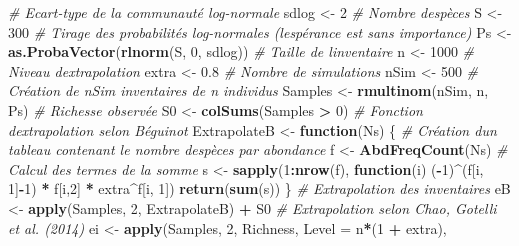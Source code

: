 \documentclass[
  11pt,
  french,
  a4paper,
  extrafontsizes,onecolumn,openright
  ]{memoir}
\newenvironment{Shaded}{\begin{snugshade}}{\end{snugshade}}
\newcommand{\AttributeTok}[1]{\textcolor[rgb]{0.13,0.29,0.53}{#1}}
\newcommand{\CommentTok}[1]{\textcolor[rgb]{0.56,0.35,0.01}{\textit{#1}}}
\newcommand{\ControlFlowTok}[1]{\textcolor[rgb]{0.13,0.29,0.53}{\textbf{#1}}}
\newcommand{\DecValTok}[1]{\textcolor[rgb]{0.00,0.00,0.81}{#1}}
\newcommand{\FloatTok}[1]{\textcolor[rgb]{0.00,0.00,0.81}{#1}}
\newcommand{\FunctionTok}[1]{\textcolor[rgb]{0.13,0.29,0.53}{\textbf{#1}}}
\newcommand{\NormalTok}[1]{#1}
\newcommand{\OtherTok}[1]{\textcolor[rgb]{0.56,0.35,0.01}{#1}}
\newcommand{\SpecialCharTok}[1]{\textcolor[rgb]{0.81,0.36,0.00}{\textbf{#1}}}
\begin{document}
\begin{Shaded}
\begin{Highlighting}[]
\CommentTok{\# Ecart{-}type de la communauté log{-}normale}
\NormalTok{sdlog }\OtherTok{\textless{}{-}} \DecValTok{2}
\CommentTok{\# Nombre d\textquotesingle{}espèces}
\NormalTok{S }\OtherTok{\textless{}{-}} \DecValTok{300}
\CommentTok{\# Tirage des probabilités log{-}normales (l\textquotesingle{}espérance est sans importance)}
\NormalTok{Ps }\OtherTok{\textless{}{-}} \FunctionTok{as.ProbaVector}\NormalTok{(}\FunctionTok{rlnorm}\NormalTok{(S, }\DecValTok{0}\NormalTok{, sdlog))}
\CommentTok{\# Taille de l\textquotesingle{}inventaire}
\NormalTok{n }\OtherTok{\textless{}{-}} \DecValTok{1000}
\CommentTok{\# Niveau d\textquotesingle{}extrapolation}
\NormalTok{extra }\OtherTok{\textless{}{-}} \FloatTok{0.8}
\CommentTok{\# Nombre de simulations}
\NormalTok{nSim }\OtherTok{\textless{}{-}} \DecValTok{500}
\CommentTok{\# Création de nSim inventaires de n individus}
\NormalTok{Samples }\OtherTok{\textless{}{-}} \FunctionTok{rmultinom}\NormalTok{(nSim, n, Ps)}
\CommentTok{\# Richesse observée}
\NormalTok{S0 }\OtherTok{\textless{}{-}} \FunctionTok{colSums}\NormalTok{(Samples }\SpecialCharTok{\textgreater{}} \DecValTok{0}\NormalTok{)}
\CommentTok{\# Fonction d\textquotesingle{}extrapolation selon Béguinot}
\NormalTok{ExtrapolateB }\OtherTok{\textless{}{-}} \ControlFlowTok{function}\NormalTok{(Ns) \{}
  \CommentTok{\# Création d\textquotesingle{}un tableau contenant le nombre d\textquotesingle{}espèces par abondance}
\NormalTok{  f }\OtherTok{\textless{}{-}} \FunctionTok{AbdFreqCount}\NormalTok{(Ns)}
  \CommentTok{\# Calcul des termes de la somme}
\NormalTok{  s }\OtherTok{\textless{}{-}} \FunctionTok{sapply}\NormalTok{(}\DecValTok{1}\SpecialCharTok{:}\FunctionTok{nrow}\NormalTok{(f), }\ControlFlowTok{function}\NormalTok{(i) }
\NormalTok{              (}\SpecialCharTok{{-}}\DecValTok{1}\NormalTok{)}\SpecialCharTok{\^{}}\NormalTok{(f[i, }\DecValTok{1}\NormalTok{]}\SpecialCharTok{{-}}\DecValTok{1}\NormalTok{) }\SpecialCharTok{*}\NormalTok{ f[i,}\DecValTok{2}\NormalTok{] }\SpecialCharTok{*}\NormalTok{ extra}\SpecialCharTok{\^{}}\NormalTok{f[i, }\DecValTok{1}\NormalTok{])}
  \FunctionTok{return}\NormalTok{(}\FunctionTok{sum}\NormalTok{(s))}
\NormalTok{\}}
\CommentTok{\# Extrapolation des inventaires}
\NormalTok{eB }\OtherTok{\textless{}{-}} \FunctionTok{apply}\NormalTok{(Samples, }\DecValTok{2}\NormalTok{, ExtrapolateB) }\SpecialCharTok{+}\NormalTok{ S0}
\CommentTok{\# Extrapolation selon Chao, Gotelli et al. (2014)}
\NormalTok{ei }\OtherTok{\textless{}{-}} \FunctionTok{apply}\NormalTok{(Samples, }\DecValTok{2}\NormalTok{, Richness, }\AttributeTok{Level =}\NormalTok{ n}\SpecialCharTok{*}\NormalTok{(}\DecValTok{1} \SpecialCharTok{+}\NormalTok{ extra), }

\end{Highlighting}
\end{Shaded}
\end{document}
